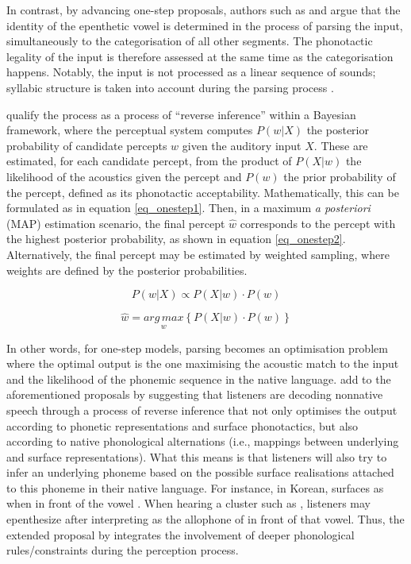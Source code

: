 In contrast, by advancing one-step proposals, authors such as \cite{dupoux2011, dejong2012} and \cite{wilson2013} argue that the identity of the epenthetic vowel is determined in the process of parsing the input, simultaneously to the categorisation of all other segments. The phonotactic legality of the input is therefore assessed at the same time as the categorisation happens. Notably, the input is not processed as a linear sequence of sounds; syllabic structure is taken into account during the parsing process \cite{kabak2007}.

\cite{wilson2013} qualify the process as a process of ``reverse inference'' within a Bayesian framework, where the perceptual system computes $P(w | X)$ the posterior probability of candidate percepts $w$ given the auditory input $X$. These are estimated, for each candidate percept, from the product of $P(X|w)$ the likelihood of the acoustics given the percept and $P(w)$ the prior probability of the percept, defined as its phonotactic acceptability. Mathematically, this can be formulated as in equation \ref{eq_onestep1}. Then, in a maximum \textit{a posteriori} (MAP) estimation scenario, the final percept $\widehat{w}$ corresponds to the percept with the highest posterior probability, as shown in equation \ref{eq_onestep2}. Alternatively, the final percept may be estimated by weighted sampling, where weights are defined by the posterior probabilities.     

\begin{equation}
  P(w | X) \propto P(X | w) \cdot P(w)
  \label{eq_onestep1}
\end{equation}

\begin{equation}
  \widehat{w} = \underset{w}{arg\,max} \left \{ P(X|w) \cdot P(w) \right \}
  \label{eq_onestep2}
\end{equation}

In other words, for one-step models, parsing becomes an optimisation problem where the optimal output is the one maximising the acoustic match to the input and the likelihood of the phonemic sequence in the native language. \cite{durvasula2015} add to the aforementioned proposals by suggesting that listeners are decoding nonnative speech through a process of reverse inference that not only optimises the output according to phonetic representations and surface phonotactics, but also according to native phonological alternations (i.e., mappings between underlying and surface representations). What this means is that listeners will also try to infer an underlying phoneme based on the possible surface realisations attached to this phoneme in their native language. For instance, in Korean,  surfaces as \textipa{[S]} when in front of the vowel . When hearing a cluster such as \textipa{[Sm]}, listeners may epenthesize \textipa{[i]} after interpreting \textipa{[S]} as the allophone of  in front of that vowel. Thus, the extended proposal by \cite{durvasula2015} integrates the involvement of deeper phonological rules/constraints during the perception process.

